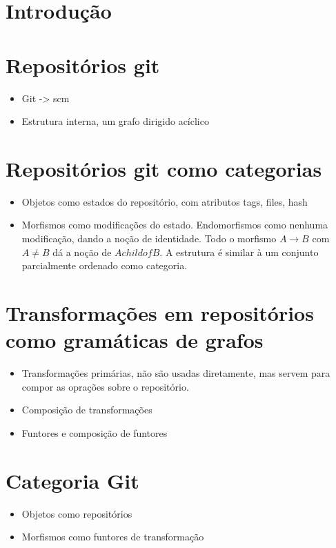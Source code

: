 \documentclass[a4paper]{article}
\begin{document}
\section*{Introdução}
\section*{Repositórios git}
\begin{itemize}
\item Git -> scm
\item Estrutura interna, um grafo dirigido acíclico
\end{itemize}
\section*{Repositórios git como categorias}
\begin{itemize}
\item Objetos como estados do repositório, com atributos tags, files, hash
\item Morfismos como modificações do estado. Endomorfismos como nenhuma modificação, dando a noção de identidade. Todo o morfismo $A \rightarrow B$ com $A \ne B$ dá a noção de $A childof B$. A estrutura é similar à um conjunto parcialmente ordenado como categoria.
\end{itemize}
\section*{Transformações em repositórios como gramáticas de grafos}
\begin{itemize}
\item Transformações primárias, não são usadas diretamente, mas servem para compor as oprações sobre o repositório.
\item Composição de transformações
\item Funtores e composição de funtores
\end{itemize}
\section*{Categoria Git}
\begin{itemize}
\item Objetos como repositórios
\item Morfismos como funtores de transformação
\end{itemize}
\end{document}
